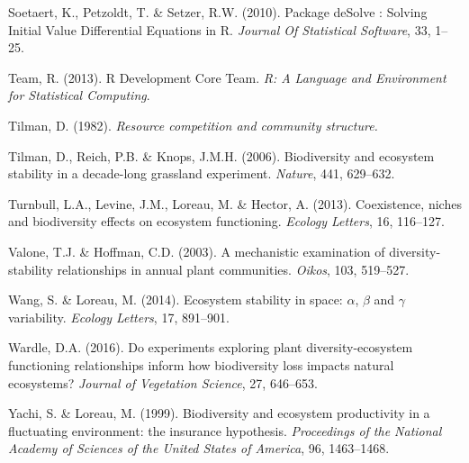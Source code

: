 \documentclass[12pt,]{article}
\begin{document}
\hypertarget{ref-Soetaert2010}{}
Soetaert, K., Petzoldt, T. \& Setzer, R.W. (2010). Package deSolve :
Solving Initial Value Differential Equations in R. \emph{Journal Of
Statistical Software}, 33, 1--25.

\hypertarget{ref-Team2013}{}
Team, R. (2013). R Development Core Team. \emph{R: A Language and
Environment for Statistical Computing}.

\hypertarget{ref-Tilman1982}{}
Tilman, D. (1982). \emph{Resource competition and community structure.}

\hypertarget{ref-Tilman2006}{}
Tilman, D., Reich, P.B. \& Knops, J.M.H. (2006). Biodiversity and
ecosystem stability in a decade-long grassland experiment.
\emph{Nature}, 441, 629--632.

\hypertarget{ref-Turnbull2013}{}
Turnbull, L.A., Levine, J.M., Loreau, M. \& Hector, A. (2013).
Coexistence, niches and biodiversity effects on ecosystem functioning.
\emph{Ecology Letters}, 16, 116--127.

\hypertarget{ref-Valone2003}{}
Valone, T.J. \& Hoffman, C.D. (2003). A mechanistic examination of
diversity-stability relationships in annual plant communities.
\emph{Oikos}, 103, 519--527.

\hypertarget{ref-Wang2014}{}
Wang, S. \& Loreau, M. (2014). Ecosystem stability in space: \(\alpha\),
\(\beta\) and \(\gamma\) variability. \emph{Ecology Letters}, 17,
891--901.

\hypertarget{ref-Wardle2016}{}
Wardle, D.A. (2016). Do experiments exploring plant diversity-ecosystem
functioning relationships inform how biodiversity loss impacts natural
ecosystems? \emph{Journal of Vegetation Science}, 27, 646--653.

\hypertarget{ref-Yachi1999}{}
Yachi, S. \& Loreau, M. (1999). Biodiversity and ecosystem productivity
in a fluctuating environment: the insurance hypothesis.
\emph{Proceedings of the National Academy of Sciences of the United
States of America}, 96, 1463--1468.
\end{document}
